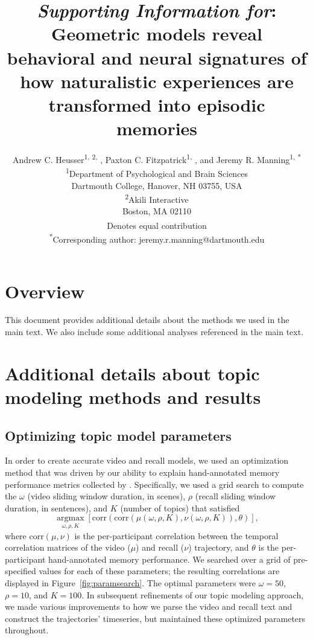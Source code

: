 \documentclass{article}
\title{\textit{Supporting Information for}: Geometric models reveal behavioral and neural signatures of how naturalistic experiences are transformed into episodic memories}
\author{Andrew C. Heusser\textsuperscript{1, 2, \textdagger}, Paxton C. Fitzpatrick\textsuperscript{1, \textdagger}, and Jeremy R. Manning\textsuperscript{1, *}\\\textsuperscript{1}Department of Psychological and Brain Sciences\\Dartmouth College, Hanover, NH 03755, USA\\\textsuperscript{2}Akili Interactive\\Boston, MA 02110\\\textsuperscript{\textdagger}Denotes equal contribution\\\textsuperscript{*}Corresponding author: jeremy.r.manning@dartmouth.edu}
\newcommand{\argmax}{\mathop{\mathrm{argmax}}\limits}
\begin{document}
\maketitle

\setcounter{equation}{0}
\setcounter{figure}{0}
\setcounter{table}{0}
\setcounter{page}{1}
\setcounter{section}{0}
\makeatletter
\renewcommand{\theequation}{S\arabic{equation}}
\renewcommand{\thefigure}{S\arabic{figure}}
\renewcommand{\bibnumfmt}[1]{[S#1]}
\renewcommand{\citenumfont}[1]{S#1}


\section*{Overview}
This document provides additional details about the methods we used in the main text.  We also include some additional analyses referenced in the main text.

\section*{Additional details about topic modeling methods and results}
\subsection*{Optimizing topic model parameters}
In order to create accurate video and recall models, we used an optimization method that was driven by our ability to explain hand-annotated memory performance metrics collected by \cite{ChenEtal17}.  Specifically, we used a grid search to compute the $\omega$ (video sliding window duration, in scenes), $\rho$ (recall sliding window duration, in sentences), and $K$ (number of topics) that satisfied
\[
\argmax_{\omega, \rho, K} \left[\mathrm{corr}\left(\mathrm{corr}\left(\mu\left(\omega, \rho, K\right), \nu\left(\omega, \rho, K\right)\right), \theta\right)\right],
\]
where $\mathrm{corr}(\mu, \nu)$ is the per-participant correlation between the temporal correlation matrices of the video ($\mu$) and recall ($\nu$) trajectory, and $\theta$ is the per-participant hand-annotated memory performance.  We searched over a grid of pre-specified values for each of these parameters; the resulting correlations are displayed in Figure~\ref{fig:paramsearch}.  The optimal parameters were $\omega = 50$, $\rho = 10$, and $K = 100$. In subsequent refinements of our topic modeling approach, we made various improvements to how we parse the video and recall text and construct the trajectories' timeseries, but maintained these optimized parameters throughout.
\end{document}

